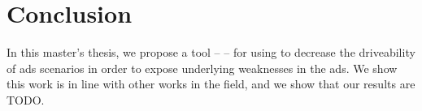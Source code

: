 \chapter{Conclusion}

In this master's thesis, we propose a tool -- \hefe -- for using  to decrease the
driveability of \acrfull{ads} scenarios in order to expose underlying weaknesses in the
\acrshort{ads}. We show this work is in line with other works in the field, and we show that our
results are TODO.
